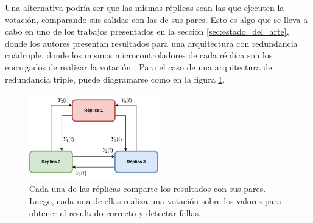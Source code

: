 
Una alternativa podría ser que las mismas réplicas sean las que ejecuten la votación, comparando sus salidas con las de sus pares. Esto es algo que se lleva a cabo en uno de los trabajos presentados en la sección \ref{sec:estado_del_arte}, donde los autores presentan resultados para una arquitectura con redundancia cuádruple, donde los mismos microcontroladores de cada réplica son los encargados de realizar la votación \cite{hiergeist2018implementation}.
Para el caso de una arquitectura de redundancia triple, puede diagramarse como en la figura \ref{fig:TMR_sin_arbitro}.


\begin{figure}[H]
    \centering
    \includegraphics[width=0.5\textwidth]{img/TMR_sin_arbitro.png}
    \caption{Cada una de las réplicas comparte los resultados con sus pares. Luego, cada una de ellas realiza una votación sobre los valores para obtener el resultado correcto y detectar fallas.}
    \label{fig:TMR_sin_arbitro}
\end{figure}

